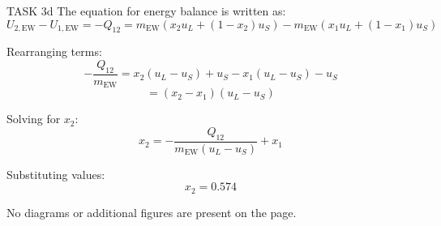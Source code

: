 TASK 3d  
The equation for energy balance is written as:  
\[
U_{2,\text{EW}} - U_{1,\text{EW}} = -Q_{12} = m_{\text{EW}} \left( x_2 u_L + (1 - x_2) u_S \right) - m_{\text{EW}} \left( x_1 u_L + (1 - x_1) u_S \right)
\]  

Rearranging terms:  
\[
-\frac{Q_{12}}{m_{\text{EW}}} = x_2 (u_L - u_S) + u_S - x_1 (u_L - u_S) - u_S
\]  
\[
= (x_2 - x_1)(u_L - u_S)
\]  

Solving for \( x_2 \):  
\[
x_2 = -\frac{Q_{12}}{m_{\text{EW}} (u_L - u_S)} + x_1
\]  

Substituting values:  
\[
x_2 = 0.574
\]  

No diagrams or additional figures are present on the page.